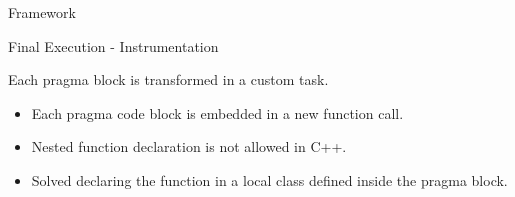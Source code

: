 \documentclass[xcolor=dvipsnames]{beamer}
\begin{document}
\begin{section}{Framework}
\begin{frame}{\hskip 0.3cm }

\end{frame}






\begin{frame}{\hskip 0.3cm Final Execution - Instrumentation}

Each pragma block is transformed in a custom task.


\begin{itemize}

\item Each pragma code block is embedded in a new function call.

\item Nested function declaration is not allowed in C++.

\item Solved declaring the function in a local class defined inside the pragma block.


\end{itemize}
\end{frame}
\end{section}
\end{document}
